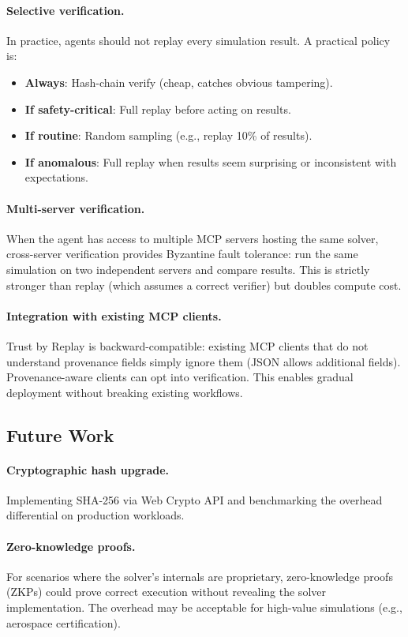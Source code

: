 \documentclass[letterpaper,twocolumn,10pt]{article}
\begin{document}
\paragraph{Selective verification.} In practice, agents should not replay
every simulation result. A practical policy is:
\begin{itemize}[nosep,leftmargin=*]
\item \textbf{Always}: Hash-chain verify (cheap, catches obvious tampering).
\item \textbf{If safety-critical}: Full replay before acting on results.
\item \textbf{If routine}: Random sampling (e.g., replay 10\% of results).
\item \textbf{If anomalous}: Full replay when results seem surprising or
  inconsistent with expectations.
\end{itemize}

\paragraph{Multi-server verification.} When the agent has access to multiple
MCP servers hosting the same solver, cross-server verification provides
Byzantine fault tolerance: run the same simulation on two independent servers
and compare results. This is strictly stronger than replay (which assumes a
correct verifier) but doubles compute cost.

\paragraph{Integration with existing MCP clients.} Trust by Replay is
backward-compatible: existing MCP clients that do not understand provenance
fields simply ignore them (JSON allows additional fields). Provenance-aware
clients can opt into verification. This enables gradual deployment without
breaking existing workflows.

\subsection{Future Work}

\paragraph{Cryptographic hash upgrade.} Implementing SHA-256 via Web
Crypto API and benchmarking the overhead differential on production workloads.

\paragraph{Zero-knowledge proofs.} For scenarios where the solver's
internals are proprietary, zero-knowledge proofs (ZKPs) could prove correct
execution without revealing the solver implementation. The overhead may be
acceptable for high-value simulations (e.g., aerospace certification).
\end{document}
